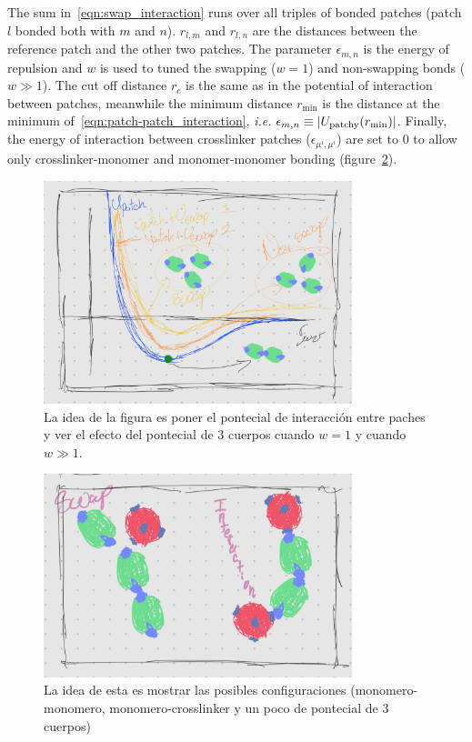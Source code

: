 The sum in~\eqref{eqn:swap_interaction} runs over all triples of bonded patches (patch $l$ bonded both with $m$ and $n$).
$r_{l,m}$ and $r_{l,n}$ are the distances between the reference patch and the other two patches.
The parameter $\epsilon_{m,n}$ is the energy of repulsion and $w$ is used to tuned the swapping ($w=1$) and non-swapping bonds ($w\gg1$). 
The cut off distance $r_c$ is the same as in the potential of interaction between patches, meanwhile the minimum distance $r_{\min}$ is the distance at the minimum of~\eqref{eqn:patch-patch_interaction}, \textit{i.e.} $\epsilon_{m,n}\equiv\abs{U_{\mathrm{patchy}}(r_{\min})}$.
Finally, the energy of interaction between crosslinker patches ($\epsilon_{\mu^i,\mu^i}$) are set to $0$ to allow only crosslinker-monomer and monomer-monomer bonding (figure~\ref{fig:intento2}).

\begin{figure}[ht]
    \centering 
    \includegraphics[width=0.8\textwidth]{figs/potentia-interactions.jpg}
    \caption{La idea de la figura es poner el pontecial de interacción entre paches y ver el efecto del pontecial de 3 cuerpos cuando $w=1$ y cuando $w\gg1$.}\label{fig:intento}
\end{figure}


\begin{figure}[ht]
    \centering 
    \includegraphics[width=0.8\textwidth]{figs/patches-interaction.jpg}
    \caption{La idea de esta es mostrar las posibles configuraciones (monomero-monomero, monomero-crosslinker y un poco de pontecial de 3 cuerpos)}\label{fig:intento2}
\end{figure}

